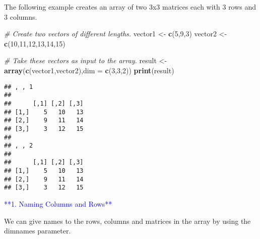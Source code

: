 \documentclass[
]{article}
\newenvironment{Shaded}{\begin{snugshade}}{\end{snugshade}}
\newcommand{\AttributeTok}[1]{\textcolor[rgb]{0.13,0.29,0.53}{#1}}
\newcommand{\CommentTok}[1]{\textcolor[rgb]{0.56,0.35,0.01}{\textit{#1}}}
\newcommand{\DecValTok}[1]{\textcolor[rgb]{0.00,0.00,0.81}{#1}}
\newcommand{\FunctionTok}[1]{\textcolor[rgb]{0.13,0.29,0.53}{\textbf{#1}}}
\newcommand{\NormalTok}[1]{#1}
\newcommand{\OtherTok}[1]{\textcolor[rgb]{0.56,0.35,0.01}{#1}}
\begin{document}
The following example creates an array of two 3x3 matrices each with 3
rows and 3 columns.

\begin{Shaded}
\begin{Highlighting}[]
\CommentTok{\# Create two vectors of different lengths.}
\NormalTok{vector1 }\OtherTok{\textless{}{-}} \FunctionTok{c}\NormalTok{(}\DecValTok{5}\NormalTok{,}\DecValTok{9}\NormalTok{,}\DecValTok{3}\NormalTok{)}
\NormalTok{vector2 }\OtherTok{\textless{}{-}} \FunctionTok{c}\NormalTok{(}\DecValTok{10}\NormalTok{,}\DecValTok{11}\NormalTok{,}\DecValTok{12}\NormalTok{,}\DecValTok{13}\NormalTok{,}\DecValTok{14}\NormalTok{,}\DecValTok{15}\NormalTok{)}

\CommentTok{\# Take these vectors as input to the array.}
\NormalTok{result }\OtherTok{\textless{}{-}} \FunctionTok{array}\NormalTok{(}\FunctionTok{c}\NormalTok{(vector1,vector2),}\AttributeTok{dim =} \FunctionTok{c}\NormalTok{(}\DecValTok{3}\NormalTok{,}\DecValTok{3}\NormalTok{,}\DecValTok{2}\NormalTok{))}
\FunctionTok{print}\NormalTok{(result)}
\end{Highlighting}
\end{Shaded}

\begin{verbatim}
## , , 1
## 
##      [,1] [,2] [,3]
## [1,]    5   10   13
## [2,]    9   11   14
## [3,]    3   12   15
## 
## , , 2
## 
##      [,1] [,2] [,3]
## [1,]    5   10   13
## [2,]    9   11   14
## [3,]    3   12   15
\end{verbatim}

\textcolor{blue}{**1. Naming Columns and Rows**}

We can give names to the rows, columns and matrices in the array by
using the dimnames parameter.
\end{document}
